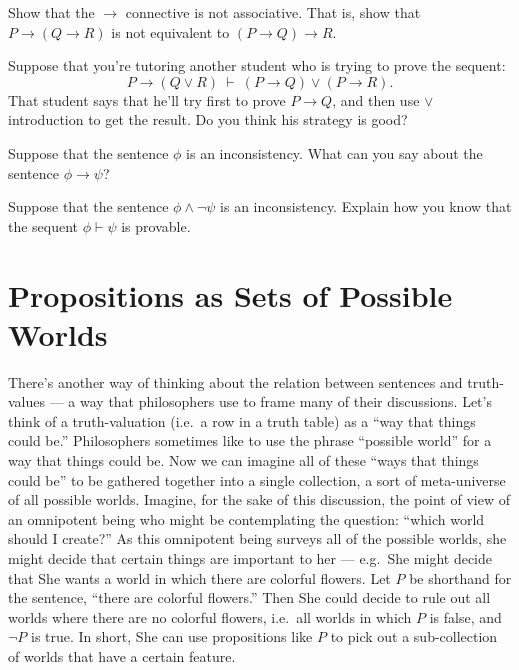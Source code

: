 \begin{exercise} Show that the $\to$ connective is not associative.
  That is, show that $P\to (Q\to R)$ is not equivalent to
  $(P\to Q)\to R$. \end{exercise}

\begin{exercise}  Suppose that you're tutoring another student who is
  trying to prove the sequent:
  \[ P\to (Q\vee R)\:\vdash\: (P\to Q)\vee (P\to R) .\] That student
  says that he'll try first to prove $P\to Q$, and then use $\vee$
  introduction to get the result.  Do you think his strategy is good?
\end{exercise}

\begin{exercise} Suppose that the sentence $\phi$ is an inconsistency.
  What can you say about the sentence $\phi\to\psi$? \end{exercise}

\begin{exercise} Suppose that the sentence $\phi\wedge\neg\psi$ is an
  inconsistency.  Explain how you know that the sequent
  $\phi\vdash\psi$ is provable. \end{exercise}



\section{Propositions as Sets of Possible Worlds}

There's another way of thinking about the relation between sentences
and truth-values --- a way that philosophers use to frame many of
their discussions.  Let's think of a truth-valuation (i.e.\ a row in a
truth table) as a ``way that things could be.''  Philosophers
sometimes like to use the phrase ``possible world'' for a way that
things could be.  Now we can imagine all of these ``ways that things
could be'' to be gathered together into a single collection, a sort of
meta-universe of all possible worlds.  Imagine, for the sake of this
discussion, the point of view of an omnipotent being who might be
contemplating the question: ``which world should I create?''  As this
omnipotent being surveys all of the possible worlds, she might decide
that certain things are important to her --- e.g.\ She might decide
that She wants a world in which there are colorful flowers.  Let $P$
be shorthand for the sentence, ``there are colorful flowers.''  Then
She could decide to rule out all worlds where there are no colorful
flowers, i.e.\ all worlds in which $P$ is false, and $\neg P$ is true.
In short, She can use propositions like $P$ to pick out a
sub-collection of worlds that have a certain feature.


